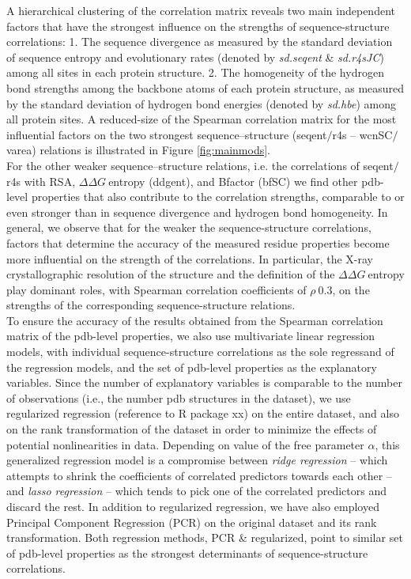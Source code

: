 \documentclass[12pt]{article}
\newcommand{\ddg}{$\Delta\Delta G~$}
\begin{document}
        A hierarchical clustering of the correlation matrix reveals two main independent factors that have the strongest influence on the strengths of sequence-structure correlations: 1. The sequence {\color{red} divergence} as measured by the standard deviation of sequence entropy and evolutionary rates (denoted by {\it sd.seqent} \& {\it sd.r4sJC}) among all sites in each protein structure.   2. The homogeneity of the hydrogen bond strengths among the backbone atoms of each protein structure, as measured by the standard deviation of hydrogen bond energies (denoted by {\it sd.hbe}) among all protein sites.   A reduced-size of the Spearman correlation matrix for the most influential factors on the two strongest sequence--structure (seqent$/$r4s -- wcnSC$/$varea) relations is illustrated in Figure \ref{fig:mainmods}.
        \\

        For the other weaker sequence--structure relations, i.e. the correlations of seqent$/$r4s with RSA, \ddg entropy (ddgent), and Bfactor (bfSC) we find other pdb-level properties that also contribute to the correlation strengths, comparable to or even stronger than in sequence divergence and hydrogen bond homogeneity. In general, we observe that for the weaker the sequence-structure correlations, factors that determine the accuracy of the measured residue properties become more influential on the strength of the correlations. In particular, the X-ray crystallographic resolution of the structure and the definition of the \ddg entropy play dominant roles, with Spearman correlation coefficients of $\rho~0.3$, on the strengths of the corresponding sequence-structure relations.
        \\

        To ensure the accuracy of the results obtained from the Spearman correlation matrix of the pdb-level properties, we also use multivariate linear regression models, with individual sequence-structure correlations as the sole regressand of the regression models, and the set of pdb-level properties as the explanatory variables.  Since the number of explanatory variables is comparable to the number of observations (i.e., the number pdb structures in the dataset), we use regularized regression {\color{red}(reference to R package xx)} on the entire dataset, and also on the rank transformation of the dataset in order to minimize the effects of potential nonlinearities in data. Depending on value of the free parameter $\alpha$, this generalized regression model is a compromise between {\it ridge regression} -- which attempts to shrink the coefficients of correlated predictors towards each other -- and {\it lasso regression} -- which tends to pick one of the correlated predictors and discard the rest. In addition to regularized regression, we have also employed Principal Component Regression (PCR) on the original dataset and its rank transformation. Both regression methods, PCR \& regularized, point to similar set of pdb-level properties as the strongest determinants of sequence-structure correlations.
\end{document}
